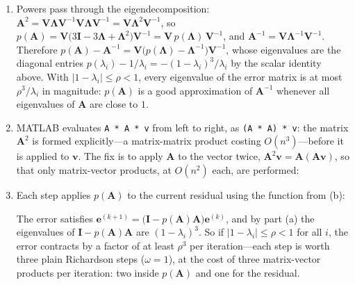 \begin{solution}
    \begin{enumerate}[label=(\alph*)]
        \item Powers pass through the eigendecomposition: $\mathbf{A}^2 = \mathbf{V}\boldsymbol{\Lambda}\mathbf{V}^{-1}\mathbf{V}\boldsymbol{\Lambda}\mathbf{V}^{-1} = \mathbf{V}\boldsymbol{\Lambda}^2\mathbf{V}^{-1}$, so $p(\mathbf{A}) = \mathbf{V}\bigl(3\mathbf{I} - 3\boldsymbol{\Lambda} + \boldsymbol{\Lambda}^2\bigr)\mathbf{V}^{-1} = \mathbf{V}\, p(\boldsymbol{\Lambda})\, \mathbf{V}^{-1}$, and $\mathbf{A}^{-1} = \mathbf{V}\boldsymbol{\Lambda}^{-1}\mathbf{V}^{-1}$. Therefore $p(\mathbf{A}) - \mathbf{A}^{-1} = \mathbf{V}\bigl(p(\boldsymbol{\Lambda}) - \boldsymbol{\Lambda}^{-1}\bigr)\mathbf{V}^{-1}$, whose eigenvalues are the diagonal entries $p(\lambda_i) - 1/\lambda_i = -(1-\lambda_i)^3/\lambda_i$ by the scalar identity above. With $|1-\lambda_i| \leq \rho < 1$, every eigenvalue of the error matrix is at most $\rho^3/\lambda_i$ in magnitude: $p(\mathbf{A})$ is a good approximation of $\mathbf{A}^{-1}$ whenever all eigenvalues of $\mathbf{A}$ are close to $1$.
        \item MATLAB evaluates \texttt{A * A * v} from left to right, as \texttt{(A * A) * v}: the matrix $\mathbf{A}^2$ is formed explicitly---a matrix-matrix product costing $O(n^3)$---before it is applied to $\mathbf{v}$. The fix is to apply $\mathbf{A}$ to the vector twice, $\mathbf{A}^2\mathbf{v} = \mathbf{A}(\mathbf{A}\mathbf{v})$, so that only matrix-vector products, at $O(n^2)$ each, are performed:
        
        \item Each step applies $p(\mathbf{A})$ to the current residual using the function from (b):
        
        The error satisfies $\mathbf{e}^{(k+1)} = \bigl(\mathbf{I} - p(\mathbf{A})\mathbf{A}\bigr)\mathbf{e}^{(k)}$, and by part (a) the eigenvalues of $\mathbf{I} - p(\mathbf{A})\mathbf{A}$ are $(1-\lambda_i)^3$. So if $|1-\lambda_i| \leq \rho < 1$ for all $i$, the error contracts by a factor of at least $\rho^3$ per iteration---each step is worth three plain Richardson steps ($\omega = 1$), at the cost of three matrix-vector products per iteration: two inside $p(\mathbf{A})$ and one for the residual.
    \end{enumerate}
\end{solution}


